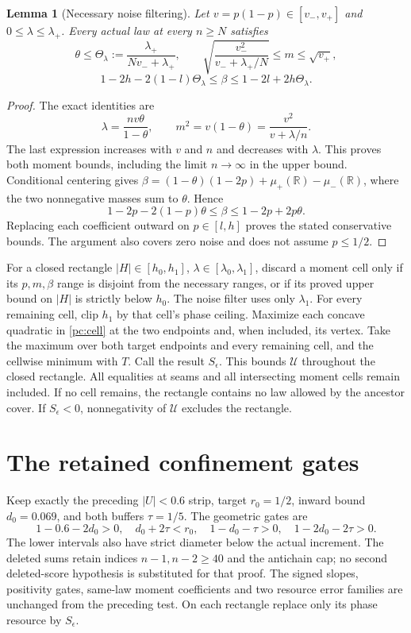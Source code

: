 \documentclass[11pt]{article}
\newtheorem{lemma}{Lemma}\newtheorem{proposition}{Proposition}
\begin{document}
\begin{lemma}[Necessary noise filtering]\label{pc:noise}
Let $v=p(1-p)\in[v_-,v_+]$ and $0\le\lambda\le\lambda_+$.
Every actual law at every $n\ge N$ satisfies
\[
 \theta\le\Theta_\lambda:=\frac{\lambda_+}{Nv_-+\lambda_+},\qquad
 \sqrt{\frac{v_-^2}{v_-+\lambda_+/N}}\le m\le\sqrt{v_+},
\]
\[
 1-2h-2(1-l)\Theta_\lambda\le\beta
       \le1-2l+2h\Theta_\lambda.
\]
\end{lemma}
\begin{proof}
The exact identities are
\[
 \lambda=\frac{nv\theta}{1-\theta},\qquad
 m^2=v(1-\theta)=\frac{v^2}{v+\lambda/n}.
\]
The last expression increases with $v$ and $n$ and decreases with
$\lambda$. This proves both moment bounds, including the limit
$n\longrightarrow\infty$ in the upper bound. Conditional centering gives
$\beta=(1-\theta)(1-2p)+\mu_+(\mathbb R)-\mu_-(\mathbb R)$,
where the two nonnegative masses sum to $\theta$. Hence
\[
 1-2p-2(1-p)\theta\le\beta\le1-2p+2p\theta.
\]
Replacing each coefficient outward on $p\in[l,h]$ proves the stated
conservative bounds. The argument also covers zero noise and does not
assume $p\le1/2$.
\end{proof}

For a closed rectangle
$|H|\in[h_0,h_1]$, $\lambda\in[\lambda_0,\lambda_1]$, discard a moment
cell only if its $p,m,\beta$ range is disjoint from the necessary ranges,
or if its proved upper bound on $|H|$ is strictly below $h_0$.
The noise filter uses only $\lambda_1$. For every remaining cell, clip
$h_1$ by that cell's phase ceiling. Maximize each concave quadratic in
\eqref{pc:cell} at the two endpoints and, when included, its vertex.
Take the maximum over both target endpoints and every remaining cell,
and the cellwise minimum with $T$. Call the result $S_\epsilon$.
This bounds $\mathcal U$ throughout the closed rectangle. All equalities
at seams and all intersecting moment cells remain included. If no cell
remains, the rectangle contains no law allowed by the ancestor cover.
If $S_\epsilon<0$, nonnegativity of $\mathcal U$ excludes the rectangle.

\section{The retained confinement gates}
Keep exactly the preceding $|U|<0.6$ strip, target $r_0=1/2$, inward
bound $d_0=0.069$, and both buffers $\tau=1/5$. The geometric gates are
\[
 1-0.6-2d_0>0,\quad d_0+2\tau<r_0,\quad
 1-d_0-\tau>0,\quad1-2d_0-2\tau>0.
\]
The lower intervals also have strict diameter below the actual increment.
The deleted sums retain indices $n-1,n-2\ge40$ and the antichain cap;
no second deleted-score hypothesis is substituted for that proof.
The signed slopes, positivity gates, same-law moment coefficients and
two resource error families are unchanged from the preceding test.
On each rectangle replace only its phase resource by $S_\epsilon$.
\end{document}
